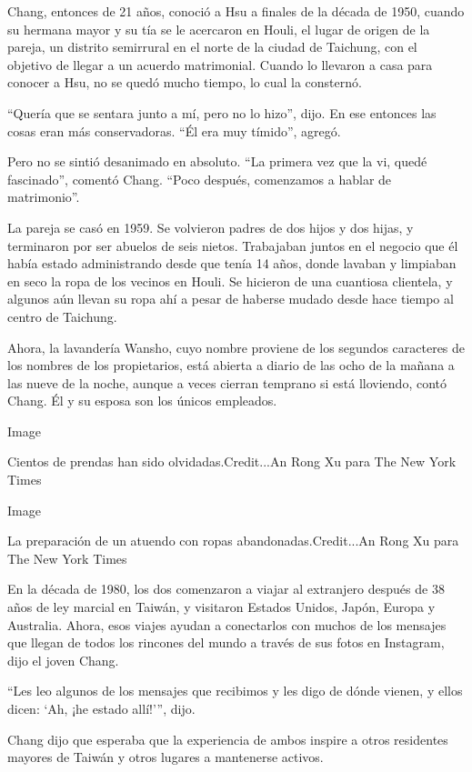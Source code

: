 Chang, entonces de 21 años, conoció a Hsu a finales de la década de
1950, cuando su hermana mayor y su tía se le acercaron en Houli, el
lugar de origen de la pareja, un distrito semirrural en el norte de la
ciudad de Taichung, con el objetivo de llegar a un acuerdo matrimonial.
Cuando lo llevaron a casa para conocer a Hsu, no se quedó mucho tiempo,
lo cual la consternó.

``Quería que se sentara junto a mí, pero no lo hizo'', dijo. En ese
entonces las cosas eran más conservadoras. ``Él era muy tímido'',
agregó.

Pero no se sintió desanimado en absoluto. ``La primera vez que la vi,
quedé fascinado'', comentó Chang. ``Poco después, comenzamos a hablar de
matrimonio''.

La pareja se casó en 1959. Se volvieron padres de dos hijos y dos hijas,
y terminaron por ser abuelos de seis nietos. Trabajaban juntos en el
negocio que él había estado administrando desde que tenía 14 años, donde
lavaban y limpiaban en seco la ropa de los vecinos en Houli. Se hicieron
de una cuantiosa clientela, y algunos aún llevan su ropa ahí a pesar de
haberse mudado desde hace tiempo al centro de Taichung.

Ahora, la lavandería Wansho, cuyo nombre proviene de los segundos
caracteres de los nombres de los propietarios, está abierta a diario de
las ocho de la mañana a las nueve de la noche, aunque a veces cierran
temprano si está lloviendo, contó Chang. Él y su esposa son los únicos
empleados.

Image

Cientos de prendas han sido olvidadas.Credit...An Rong Xu para The New
York Times

Image

La preparación de un atuendo con ropas abandonadas.Credit...An Rong Xu
para The New York Times

En la década de 1980, los dos comenzaron a viajar al extranjero después
de 38 años de ley marcial en Taiwán, y visitaron Estados Unidos, Japón,
Europa y Australia. Ahora, esos viajes ayudan a conectarlos con muchos
de los mensajes que llegan de todos los rincones del mundo a través de
sus fotos en Instagram, dijo el joven Chang.

``Les leo algunos de los mensajes que recibimos y les digo de dónde
vienen, y ellos dicen: `Ah, ¡he estado allí!''', dijo.

Chang dijo que esperaba que la experiencia de ambos inspire a otros
residentes mayores de Taiwán y otros lugares a mantenerse activos.

